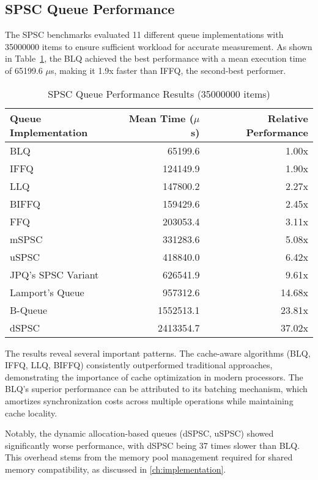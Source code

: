 \subsection{\acf{SPSC} Queue Performance}
The \ac{SPSC} benchmarks evaluated 11 different queue implementations with 35000000 items to ensure sufficient workload for accurate measurement. As shown in Table~\ref{tab:spsc-results}, the \ac{BLQ} achieved the best performance with a mean execution time of 65199.6 $\mu$s, making it 1.9x faster than \ac{IFFQ}, the second-best performer.

\begin{table}[htb]
\centering
\caption{\ac{SPSC} Queue Performance Results (35000000 items)}
\label{tab:spsc-results}
\begin{tabular}{@{}lrr@{}}
\toprule
Queue Implementation & Mean Time ($\mu$s) & Relative Performance \\
\midrule
\ac{BLQ} & 65199.6 & 1.00x \\
\ac{IFFQ} & 124149.9 & 1.90x \\
\ac{LLQ} & 147800.2 & 2.27x \\
\ac{BIFFQ} & 159429.6 & 2.45x \\
\ac{FFQ} & 203053.4 & 3.11x \\
\ac{mSPSC} & 331283.6 & 5.08x \\
\ac{uSPSC} & 418840.0 & 6.42x \\
\ac{JPQ}'s \ac{SPSC} Variant & 626541.9 & 9.61x \\
Lamport's Queue & 957312.6 & 14.68x \\
B-Queue & 1552513.1 & 23.81x \\
\ac{dSPSC} & 2413354.7 & 37.02x \\
\bottomrule
\end{tabular}
\end{table}

The results reveal several important patterns. The cache-aware algorithms (\ac{BLQ}, \ac{IFFQ}, \ac{LLQ}, \ac{BIFFQ}) consistently outperformed traditional approaches, demonstrating the importance of cache optimization in modern processors. The \ac{BLQ}'s superior performance can be attributed to its batching mechanism, which amortizes synchronization costs across multiple operations while maintaining cache locality.

Notably, the dynamic allocation-based queues (dSPSC, uSPSC) showed significantly worse performance, with dSPSC being 37 times slower than \ac{BLQ}. This overhead stems from the memory pool management required for shared memory compatibility, as discussed in \cref{ch:implementation}.


